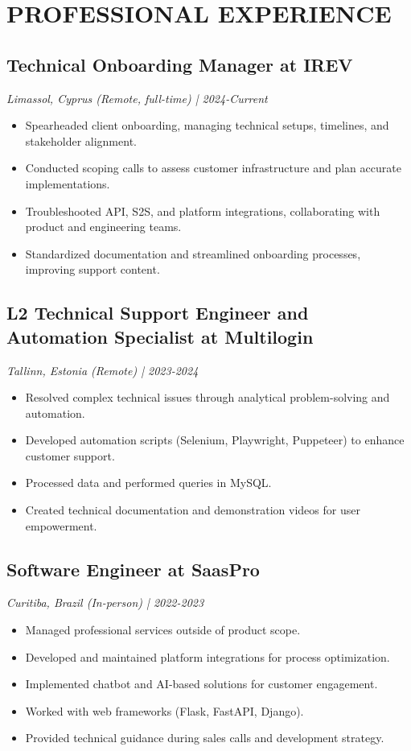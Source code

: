 \documentclass[10pt, letterpaper]{article}
\begin{document}
\section*{PROFESSIONAL EXPERIENCE}

\subsection*{Technical Onboarding Manager at IREV}
\textit{Limassol, Cyprus (Remote, full-time) | 2024-Current}
\begin{itemize}
\item Spearheaded client onboarding, managing technical setups, timelines, and stakeholder alignment.
\item Conducted scoping calls to assess customer infrastructure and plan accurate implementations.
\item Troubleshooted API, S2S, and platform integrations, collaborating with product and engineering teams.
\item Standardized documentation and streamlined onboarding processes, improving support content.
\end{itemize}

\subsection*{L2 Technical Support Engineer and Automation Specialist at Multilogin}
\textit{Tallinn, Estonia (Remote) | 2023-2024}
\begin{itemize}
\item Resolved complex technical issues through analytical problem-solving and automation.
\item Developed automation scripts (Selenium, Playwright, Puppeteer) to enhance customer support.
\item Processed data and performed queries in MySQL.
\item Created technical documentation and demonstration videos for user empowerment.
\end{itemize}


\subsection*{Software Engineer at SaasPro}
\textit{Curitiba, Brazil (In-person) | 2022-2023}
\begin{itemize}
\item Managed professional services outside of product scope.
\item Developed and maintained platform integrations for process optimization.
\item Implemented chatbot and AI-based solutions for customer engagement.
\item Worked with web frameworks (Flask, FastAPI, Django).
\item Provided technical guidance during sales calls and development strategy.
\end{itemize}
\end{document}
